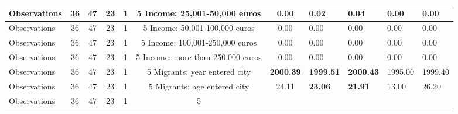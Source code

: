 \begin{tabular}{l c c c c c c }
\midrule
Observations &        36 &        47 &        23 &         1 &         5
Income: 25,001-50,000 euros & \textbf{     0.00} & \textbf{     0.02} & \textbf{     0.04} &      0.00 & \textbf{     0.00} \\
\midrule
Observations &        36 &        47 &        23 &         1 &         5
Income: 50,001-100,000 euros &      0.00 &      0.00 &      0.00 &      0.00 &      0.00 \\
\midrule
Observations &        36 &        47 &        23 &         1 &         5
Income: 100,001-250,000 euros &      0.00 &      0.00 &      0.00 &      0.00 &      0.00 \\
\midrule
Observations &        36 &        47 &        23 &         1 &         5
Income: more than 250,000 euros &      0.00 &      0.00 &      0.00 &      0.00 &      0.00 \\
\midrule
Observations &        36 &        47 &        23 &         1 &         5
Migrants: year entered city & \textbf{  2000.39} & \textbf{  1999.51} & \textbf{  2000.43} &   1995.00 &   1999.40 \\
\midrule
Observations &        36 &        47 &        23 &         1 &         5
Migrants: age entered city &     24.11 & \textbf{    23.06} & \textbf{    21.91} &     13.00 &     26.20 \\
\midrule
Observations &        36 &        47 &        23 &         1 &         5
\bottomrule
\end{tabular}
